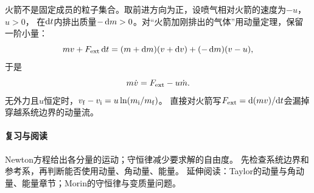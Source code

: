 火箭不是固定成员的粒子集合。取前进方向为正，设喷气相对火箭的速度为$-u$，$u > 0$，
在$\mathop{}\!\mathrm{d} t$内排出质量$-\mathop{}\!\mathrm{d} m > 0$。对“火箭加刚排出的气体”用动量定理，保留一阶小量：
\[
 mv + F_{\mathrm{ext}}\mathop{}\!\mathrm{d} t = (m + \mathop{}\!\mathrm{d} m)(v + \mathop{}\!\mathrm{d} v) + (-\mathop{}\!\mathrm{d} m)(v - u),
\]
于是
\begin{equation}
 m\dot v = F_{\mathrm{ext}} - u\dot m.
\end{equation}
无外力且$u$恒定时，$v_\mathrm f - v_\mathrm i = u\ln(m_\mathrm i/m_\mathrm f)$。
直接对火箭写$F_{\mathrm{ext}} = \mathop{}\!\mathrm{d}(mv)/\mathrm{d} t$会漏掉穿越系统边界的动量流。

\paragraph{复习与阅读}
Newton方程给出各分量的运动；守恒律减少要求解的自由度。
先检查系统边界和参考系，再判断能否使用动量、角动量、能量。
延伸阅读：Taylor的动量与角动量、能量章节；Morin的守恒律与变质量问题。
